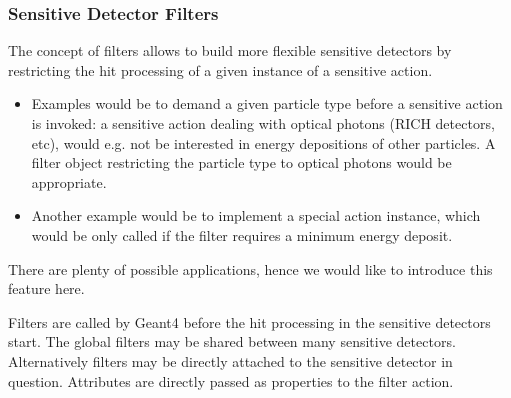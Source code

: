 \documentclass[10pt,a4paper]{article}
\begin{document}
\subsubsection{Sensitive Detector Filters}
\label{sec:ddg4-implementation-sensitive-detector-filters}

\noindent
The concept of filters allows to build more flexible sensitive detectors by
restricting the hit processing of a given instance of a sensitive action.

\begin{itemize}\itemcompact
\item Examples would be to demand a given particle type before a sensitive action is 
invoked: a sensitive action dealing with optical photons (RICH detectors, etc),
would e.g. not be interested in energy depositions of other particles.
A filter object restricting the particle type to optical photons would 
be appropriate.
\item Another example would be to implement a special action instance, which would
be only called if the filter requires a minimum energy deposit.
\end{itemize}
There are plenty of possible applications, hence we would like 
to introduce this feature here.

\noindent
Filters are called by Geant4 before the
hit processing in the sensitive detectors start. The global filters
may be shared between many sensitive detectors. Alternatively filters
may be directly attached to the sensitive detector in question.
Attributes are directly passed as properties to the filter action.
\end{document}
